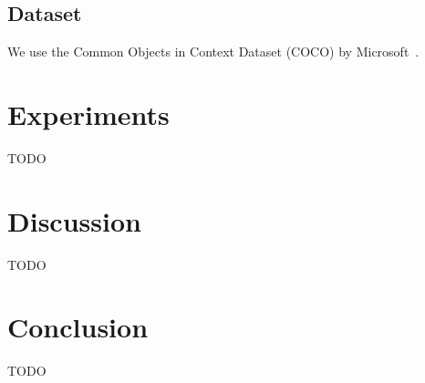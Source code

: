 \documentclass[11pt,twocolumn,twoside,paper=a4]{IEEEtran}
\begin{document}
\subsection{Dataset}
We use the Common Objects in Context Dataset (COCO) by Microsoft~\cite{lin2015microsoft}.
\section{Experiments}
TODO

\section*{Discussion}
TODO

\section*{Conclusion}
TODO




\end{document}
